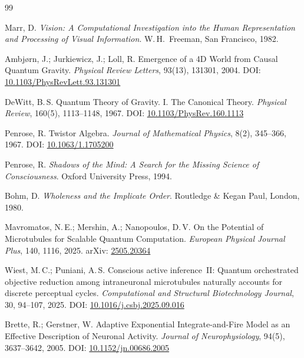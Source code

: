 \documentclass[11pt,a4paper]{article}
\begin{document}
\begin{thebibliography}{99}

Marr, D.
\newblock \emph{Vision: A Computational Investigation into the Human Representation and Processing of Visual Information}.
\newblock W.\,H.\ Freeman, San Francisco, 1982.

Ambjørn, J.; Jurkiewicz, J.; Loll, R.
\newblock Emergence of a 4D World from Causal Quantum Gravity.
\newblock \emph{Physical Review Letters}, 93(13), 131301, 2004.
\newblock DOI: \href{https://doi.org/10.1103/PhysRevLett.93.131301}{10.1103/PhysRevLett.93.131301}

DeWitt, B.\,S.
\newblock Quantum Theory of Gravity. I. The Canonical Theory.
\newblock \emph{Physical Review}, 160(5), 1113--1148, 1967.
\newblock DOI: \href{https://doi.org/10.1103/PhysRev.160.1113}{10.1103/PhysRev.160.1113}

Penrose, R.
\newblock Twistor Algebra.
\newblock \emph{Journal of Mathematical Physics}, 8(2), 345--366, 1967.
\newblock DOI: \href{https://doi.org/10.1063/1.1705200}{10.1063/1.1705200}

Penrose, R.
\newblock \emph{Shadows of the Mind: A Search for the Missing Science of
  Consciousness}.
\newblock Oxford University Press, 1994.

Bohm, D.
\newblock \emph{Wholeness and the Implicate Order}.
\newblock Routledge \& Kegan Paul, London, 1980.

Mavromatos, N.\,E.; Mershin, A.; Nanopoulos, D.\,V.
\newblock On the Potential of Microtubules for Scalable Quantum Computation.
\newblock \emph{European Physical Journal Plus}, 140, 1116, 2025.
\newblock arXiv: \href{https://arxiv.org/abs/2505.20364}{2505.20364}

Wiest, M.\,C.; Puniani, A.\,S.
\newblock Conscious active inference~II: Quantum orchestrated objective
  reduction among intraneuronal microtubules naturally accounts for discrete
  perceptual cycles.
\newblock \emph{Computational and Structural Biotechnology Journal},
  30, 94--107, 2025.
\newblock DOI: \href{https://doi.org/10.1016/j.csbj.2025.09.016}{10.1016/j.csbj.2025.09.016}

Brette, R.; Gerstner, W.
\newblock Adaptive Exponential Integrate-and-Fire Model as an Effective
  Description of Neuronal Activity.
\newblock \emph{Journal of Neurophysiology}, 94(5), 3637--3642, 2005.
\newblock DOI: \href{https://doi.org/10.1152/jn.00686.2005}{10.1152/jn.00686.2005}


\end{thebibliography}
\end{document}
